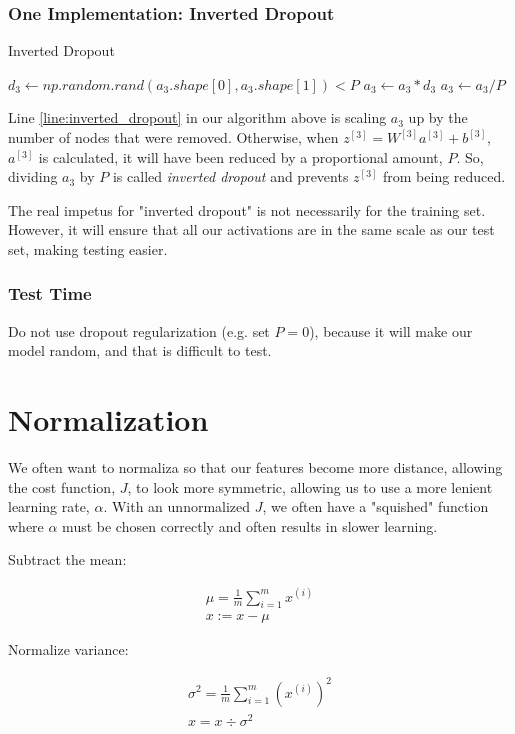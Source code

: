 \documentclass{article}
\begin{document}
\subsubsection{One Implementation: Inverted Dropout}

\begin{algorithm}[h]
\caption{Inverted Dropout}
$d_3 \gets np.random.rand(a_3.shape[0], a_3.shape[1]) < P$ \;
$a_3 \gets a_3 * d_3$ \;
$a_3 \gets a_3 / P$ \; \label{line:inverted_dropout}
\end{algorithm}

Line \ref{line:inverted_dropout} in our algorithm above is scaling $a_3$ up by the number of nodes that were removed.  Otherwise, when $z^{[3]} = W^{[3]} a^{[3]} + b^{[3]}$, $a^{[3]}$ is calculated, it will have been reduced by a proportional amount, $P$.  So, dividing $a_3$ by $P$ is called \textit{inverted dropout} and prevents $z^{[3]}$ from being reduced.

The real impetus for "inverted dropout" is not necessarily for the training set.  However, it will ensure that all our activations are in the same scale as our test set, making testing easier.

\subsubsection{Test Time}

Do not use dropout regularization (e.g. set $P = 0$), because it will make our model random, and that is difficult to test.

\section{Normalization}

We often want to normaliza so that our features become more distance, allowing the cost function, $J$, to look more symmetric, allowing us to use a more lenient learning rate, $\alpha$.  With an unnormalized $J$, we often have a "squished" function where $\alpha$ must be chosen correctly and often results in slower learning.

Subtract the mean:

\begin{gather}
\mu = \frac{1}{m} \sum_{i=1}^{m} x^{(i)} \\
x := x - \mu
\end{gather}


Normalize variance:

\begin{gather}
\sigma^2 = \frac{1}{m} \sum_{i=1}^{m} (x^{(i)})^2 \\
x = x \div \sigma^2
\end{gather}
\end{document}
